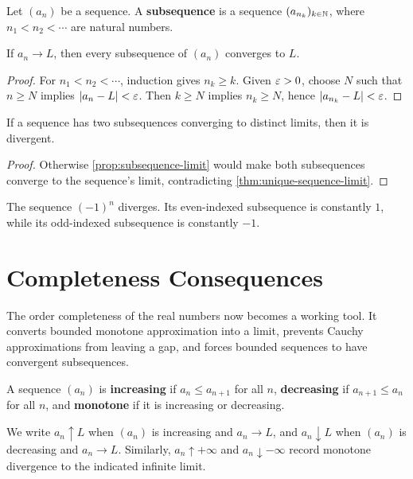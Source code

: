 \begin{definition}[Subsequence]
Let $(a_n)$ be a sequence. A \textbf{subsequence} is a sequence $(a_{n_k})_{k\in\mathbb{N}}$, where $n_1<n_2<\cdots$ are natural numbers.
\end{definition}

\begin{proposition}
\label{prop:subsequence-limit}
If $a_n\to L$, then every subsequence of $(a_n)$ converges to $L$.
\end{proposition}
\begin{proof}
For $n_1<n_2<\cdots$, induction gives $n_k\geq k$. Given $\varepsilon>0$, choose $N$ such that $n\geq N$ implies $\lvert a_n-L\rvert<\varepsilon$. Then $k\geq N$ implies $n_k\geq N$, hence $\lvert a_{n_k}-L\rvert<\varepsilon$.
\end{proof}

\begin{corollary}
If a sequence has two subsequences converging to distinct limits, then it is divergent.
\end{corollary}
\begin{proof}
Otherwise \cref{prop:subsequence-limit} would make both subsequences converge to the sequence's limit, contradicting \cref{thm:unique-sequence-limit}.
\end{proof}

\begin{example}
The sequence $(-1)^n$ diverges. Its even-indexed subsequence is constantly $1$, while its odd-indexed subsequence is constantly $-1$.
\end{example}

\section{Completeness Consequences}

The order completeness of the real numbers now becomes a working tool.
It converts bounded monotone approximation into a limit, prevents Cauchy
approximations from leaving a gap, and forces bounded sequences to have
convergent subsequences.

\begin{definition}
A sequence $(a_n)$ is \textbf{increasing} if $a_n\leq a_{n+1}$ for all $n$, \textbf{decreasing} if $a_{n+1}\leq a_n$ for all $n$, and \textbf{monotone} if it is increasing or decreasing.
\end{definition}
We write $a_n\uparrow L$ when $(a_n)$ is increasing and $a_n\to L$, and
$a_n\downarrow L$ when $(a_n)$ is decreasing and $a_n\to L$. Similarly,
$a_n\uparrow+\infty$ and $a_n\downarrow-\infty$ record monotone divergence
to the indicated infinite limit.

